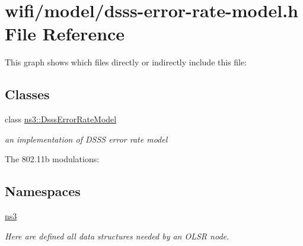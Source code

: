 \hypertarget{dsss-error-rate-model_8h}{}\section{wifi/model/dsss-\/error-\/rate-\/model.h File Reference}
\label{dsss-error-rate-model_8h}
This graph shows which files directly or indirectly include this file\+:
\subsection*{Classes}
\begin{DoxyCompactItemize}
\item 
class \hyperlink{classns3_1_1DsssErrorRateModel}{ns3\+::\+Dsss\+Error\+Rate\+Model}
\begin{DoxyCompactList}\small\item\em an implementation of D\+S\+SS error rate model

The 802.\+11b modulations\+: \end{DoxyCompactList}\end{DoxyCompactItemize}
\subsection*{Namespaces}
\begin{DoxyCompactItemize}
\item 
 \hyperlink{namespacens3}{ns3}
\begin{DoxyCompactList}\small\item\em Here are defined all data structures needed by an O\+L\+SR node. \end{DoxyCompactList}\end{DoxyCompactItemize}
